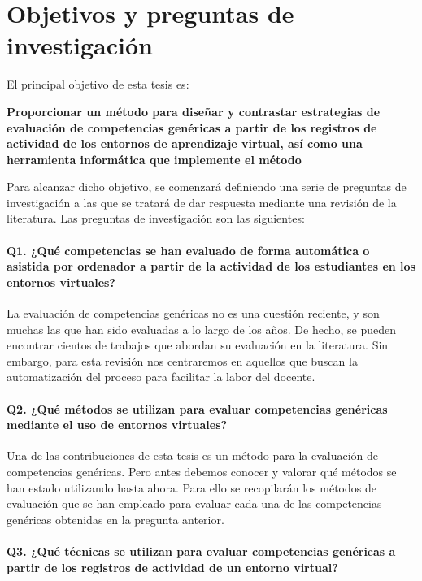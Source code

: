 
\section{Objetivos y preguntas de investigación}
\label{sec:objetivos}

El principal objetivo de esta tesis es:


\bigskip
\textbf{Proporcionar un método para diseñar y contrastar estrategias de evaluación de competencias genéricas a partir de los registros de actividad de los entornos de aprendizaje virtual, así como una herramienta informática que implemente el método}
\bigskip

Para alcanzar dicho objetivo, se comenzará definiendo una serie de preguntas de investigación a las que se tratará de dar respuesta mediante una revisión de la literatura. Las preguntas de investigación son las siguientes:

\paragraph*{Q1. ¿Qué competencias se han evaluado de forma automática o asistida por ordenador a partir de la actividad de los estudiantes en los entornos virtuales?}

La evaluación de competencias genéricas no es una cuestión reciente, y son muchas las que han sido evaluadas a lo largo de los años. De hecho, se pueden encontrar cientos de trabajos que abordan su evaluación en la literatura. Sin embargo, para esta revisión nos centraremos en aquellos que buscan la automatización del proceso para facilitar la labor del docente.

\paragraph*{Q2. ¿Qué métodos se utilizan para evaluar competencias genéricas mediante el uso de entornos virtuales?}

Una de las contribuciones de esta tesis es un método para la evaluación de competencias genéricas. Pero antes debemos conocer y valorar qué métodos se han estado utilizando hasta ahora. Para ello se recopilarán los métodos de evaluación que se han empleado para evaluar cada una de las competencias genéricas obtenidas en la pregunta anterior.

\paragraph*{Q3. ¿Qué técnicas se utilizan para evaluar competencias genéricas a partir de los registros de actividad de un entorno virtual?}

